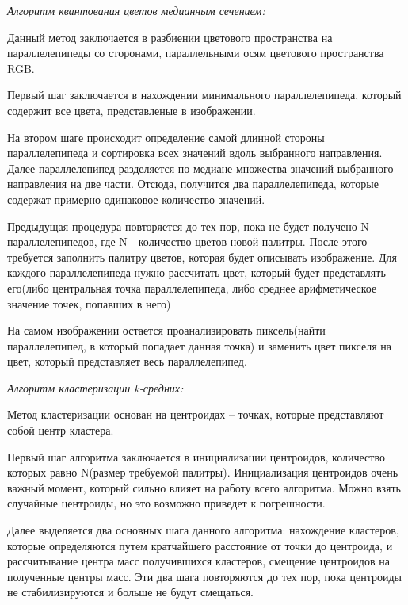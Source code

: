 \textit{Алгоритм квантования цветов медианным сечением:}

Данный метод заключается в разбиении цветового пространства на параллелепипеды со сторонами, параллельными осям цветового пространства RGB.

Первый шаг заключается в нахождении минимального параллелепипеда, который содержит все цвета, представленые в изображении.

На втором шаге происходит определение самой длинной стороны параллелепипеда и сортировка всех значений вдоль выбранного направления. Далее параллелепипед разделяется по медиане множества значений выбранного направления на две части. Отсюда, получится два параллелепипеда, которые содержат примерно одинаковое количество значений. 

Предыдущая процедура повторяется до тех пор, пока не будет получено N параллелепипедов, где N - количество цветов новой палитры. После этого требуется заполнить палитру цветов, которая будет описывать изображение. Для каждого параллелепипеда нужно рассчитать цвет, который будет представлять его(либо центральная точка параллелепипеда, либо среднее арифметическое значение точек, попавших в него)

На самом изображении остается проанализировать пиксель(найти параллелепипед, в который попадает данная точка) и заменить цвет пикселя на цвет, который представляет весь параллелепипед.

\textit{Алгоритм кластеризации k-средних:}

Метод кластеризации основан на центроидах -- точках, которые представляют собой центр кластера.

Первый шаг алгоритма заключается в инициализации центроидов, количество которых равно N(размер требуемой палитры). Инициализация центроидов очень важный момент, который сильно влияет на работу всего алгоритма. Можно взять случайные центроиды, но это возможно приведет к погрешности.

Далее выделяется два основных шага данного алгоритма: нахождение кластеров, которые определяются путем кратчайшего расстояние от точки до центроида, и рассчитывание центра масс получившихся кластеров, смещение центроидов на полученные центры масс. Эти два шага повторяются до тех пор, пока центроиды не стабилизируются и больше не будут смещаться.

\begin{figure}[ht!]
\end{figure}


